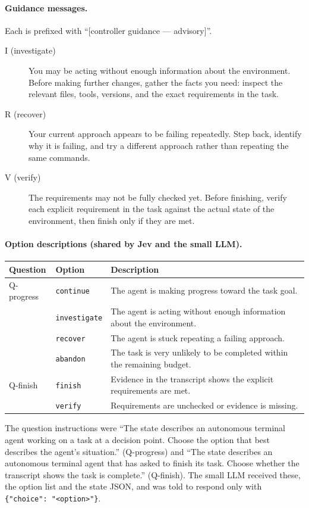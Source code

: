 \documentclass[10pt]{article}
\begin{document}
\paragraph{Guidance messages.}
Each is prefixed with ``[controller guidance --- advisory]''.
\begin{description}
  \item[I (investigate)] You may be acting without enough information about the environment. Before making further changes, gather the facts you need: inspect the relevant files, tools, versions, and the exact requirements in the task.
  \item[R (recover)] Your current approach appears to be failing repeatedly. Step back, identify why it is failing, and try a different approach rather than repeating the same commands.
  \item[V (verify)] The requirements may not be fully checked yet. Before finishing, verify each explicit requirement in the task against the actual state of the environment, then finish only if they are met.
\end{description}

\paragraph{Option descriptions (shared by Jev and the small LLM).}
\begin{center}\small
\begin{tabularx}{\linewidth}{@{}llX@{}}
  \toprule
  Question & Option & Description \\
  \midrule
  Q-progress & \texttt{continue} & The agent is making progress toward the task goal. \\
             & \texttt{investigate} & The agent is acting without enough information about the environment. \\
             & \texttt{recover} & The agent is stuck repeating a failing approach. \\
             & \texttt{abandon} & The task is very unlikely to be completed within the remaining budget. \\
  Q-finish   & \texttt{finish} & Evidence in the transcript shows the explicit requirements are met. \\
             & \texttt{verify} & Requirements are unchecked or evidence is missing. \\
  \bottomrule
\end{tabularx}
\end{center}
The question instructions were ``The state describes an autonomous terminal agent working on a task at a decision point. Choose the option that best describes the agent's situation.'' (Q-progress) and ``The state describes an autonomous terminal agent that has asked to finish its task. Choose whether the transcript shows the task is complete.'' (Q-finish).
The small LLM received these, the option list and the state JSON, and was told to respond only with \texttt{\{"choice": "<option>"\}}.
\end{document}

